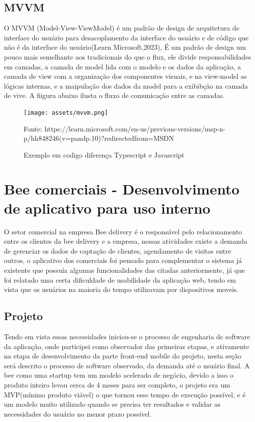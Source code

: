 \documentclass{ufersa}
\begin{document}
\subsection{MVVM}
O MVVM (Model-View-ViewModel) é um padrão de design de arquitetura de interface do usuário para desacoplamento da interface do usuário e de código que não é da interface do usuário(Learn Microsoft,2023), É um padrão de design um pouco mais semelhante aos tradicionais do que o flux, ele divide responsabilidades em camadas, a camada de model lida com o modelo e os dados da aplicação, a camada de view com a organização  dos componentes visuais, e na view-model as lógicas internas, e a  maipulação dos dados da model para a exibibção na camada de vive. A fiigura abaixo ilusta o fluxo de comunicação entre as camadas.
\begin{figure}[!h]
\centering
\caption{Exemplo em codigo diferença Typescript e Javascript}
\texttt{[image: assets/mvvm.png]} 
{\footnotesize

Fonte: https://learn.microsoft.com/en-us/previous-versions/msp-n-p/hh848246(v=pandp.10)?redirectedfrom=MSDN}
\label{fig:mvvm}
\end{figure}

\section{ Bee comerciais - Desenvolvimento de aplicativo para uso interno}
O setor comercial na empresa Bee delivery é o responsável pelo relacionamento entre os clientes da bee delivery e a empresa, nessas atividades existe a demanda de gerenciar os dados de captação de clientes, agendamento de visitas entre outros, o aplicativo dos comerciais foi pensado para complementar o sistema já existente que possuía algumas funcionalidades das citadas anteriormente, já que foi relatado uma certa dificuldade de usabilidade da aplicação web, tendo em vista que os usuários na maioria do tempo utilizavam por dispositivos moveis. 

\subsection{Projeto}
Tendo em vista essas necessidades iniciou-se o processo de engenharia de software da aplicação, onde participei como observador das primeiras etapas, e ativamente na etapa de desenvolvimento da parte front-end mobile do projeto, nesta seção será descrito o processo de software observado, da demanda até o usuário final. A bee como uma startup tem um modelo acelerado de negócio, devido a isso o produto inteiro levou cerca de 4 meses para ser completo, o projeto era um MVP(mínimo produto viável) o que tornou esse tempo de execução possível, e é um modelo muito utilizado quando se precisa ter resultados e validar as necessidades do usuário no menor prazo possível.
\end{document}

